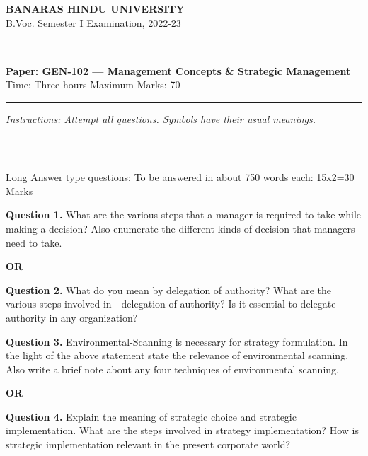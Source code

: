 \documentclass[11pt,a4paper]{article}
\begin{document}
\begin{center}
  {\large\bfseries BANARAS HINDU UNIVERSITY}\\[2pt]
  {\normalsize B.Voc. Semester I Examination, 2022-23}\\[6pt]
  \rule{0.8\linewidth}{0.5pt}\\[6pt]
  {\large\bfseries Paper: GEN-102 --- Management Concepts \& Strategic Management}\\[4pt]
  {\normalsize Time: Three hours \hfill Maximum Marks: 70}
\end{center}

\rule{\linewidth}{0.4pt}

\smallskip



\noindent   \textit{Instructions: Attempt all questions. Symbols have their usual meanings.}

\bigskip


\bigskip


\\[4pt]
\rule{\linewidth}{0.4pt}\smallskip

Long Answer type questions:
To be answered in about 750 words each: 15x2=30 Marks

\medskip


\noindent   \textbf{Question 1.} What are the various steps that a manager is required to take while making a decision?
Also enumerate the different kinds of decision that managers need to take.
\centerline{   \textbf{OR}}

\medskip


\noindent   \textbf{Question 2.} What do you mean by delegation of authority? What are the various steps involved in
- delegation of authority? Is it essential to delegate authority in any organization?

\medskip


\noindent   \textbf{Question 3.} Environmental-Scanning is necessary for strategy formulation. In the light of the
above statement state the relevance of environmental scanning. Also write a brief note about any four
techniques of environmental scanning.
\centerline{   \textbf{OR}}

\medskip


\noindent   \textbf{Question 4.} Explain the meaning of strategic choice and strategic implementation. What are the
steps involved in strategy implementation? How is strategic implementation relevant in the present
corporate world?
\end{document}
